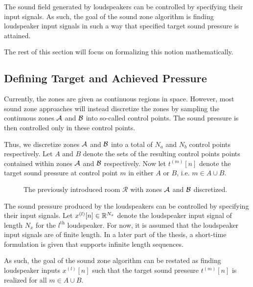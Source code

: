 The sound field generated by loudspeakers can be controlled by specifying their input signals.
As such, the goal of the sound zone algorithm is finding loudspeaker input signals in such a way that 
specified target sound pressure is attained.

The rest of this section will focus on formalizing this notion mathematically.

\subsection{Defining Target and Achieved Pressure}
\label{ch:sound_zone:data_model:target_pressure}
Currently, the zones are given as continuous regions in space.
However, most sound zone approaches will instead discretize the zones by sampling the continuous zones 
$\mathcal{A}$ and $\mathcal{B}$ into so-called control points.
The sound pressure is then controlled only in these control points.

Thus, we discretize zones $\mathcal{A}$ and $\mathcal{B}$ into a total of $N_a$ and $N_b$ control points respectively.   
Let $A$ and $B$ denote the sets of the resulting control points points contained within zones $\mathcal{A}$ and $\mathcal{B}$ respectively.
Now let $t^{(m)}[n]$ denote the target sound pressure at control point $m$ in either $A$ or $B$, i.e. $m\in A \cup B$.

\begin{figure}
    \centering
    
    \caption{The previously introduced room $\mathcal{R}$ with zones $\mathcal{A}$ and $\mathcal{B}$ discretized.}
\end{figure}

The sound pressure produced by the loudspeakers can be controlled by specifying their input signals.
Let $x^{(l)}[n]\in\mathbb{R}^{N_x}$ denote the loudspeaker input signal of length $N_x$ for the $l^\text{th}$ loudspeaker.
For now, it is assumed that the loudspeaker input signals are of finite length. 
In a later part of the thesis, a short-time formulation is given that supports infinite length sequences. 

As such, the goal of the sound zone algorithm can be restated as finding loudspeaker inputs $x^{(l)}[n]$ 
such that the target sound pressure $t^{(m)}[n]$ is realized for all $m\in A \cup B$.

